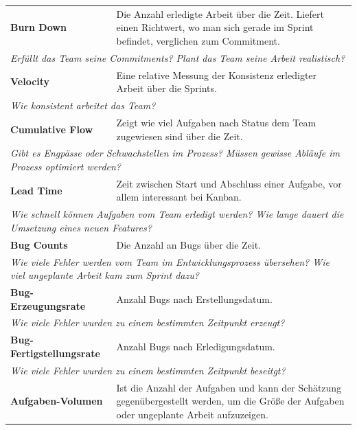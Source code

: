 \begin{table}[H]
  \centering
  \begin{tabular}{p{5cm}p{9.5cm}} \toprule
  \textbf{Burn Down} & Die Anzahl erledigte Arbeit über die Zeit. Liefert einen Richtwert, wo man sich gerade im Sprint befindet, verglichen zum Commitment. \\
  \multicolumn{2}{p{14.5cm}}{\textit{Erfüllt das Team seine Commitments? \newline Plant das Team seine Arbeit realistisch?}} \\ \midrule
  \textbf{Velocity} & Eine relative Messung der Konsistenz erledigter Arbeit über die Sprints. \\
  \multicolumn{2}{p{14.5cm}}{\textit{Wie konsistent arbeitet das Team?}} \\ \midrule
  \textbf{Cumulative Flow} & Zeigt wie viel Aufgaben nach Status dem Team zugewiesen sind über die Zeit. \\
  \multicolumn{2}{p{14.5cm}}{\textit{Gibt es Engpässe oder Schwachstellen im Prozess? \newline Müssen gewisse Abläufe im Prozess optimiert werden?}} \\ \midrule
  \textbf{Lead Time} & Zeit zwischen Start und Abschluss einer Aufgabe, vor allem interessant bei Kanban. \\
  \multicolumn{2}{p{14.5cm}}{\textit{Wie schnell können Aufgaben vom Team erledigt werden? \newline Wie lange dauert die Umsetzung eines neuen Features?}} \\ \midrule
  \textbf{Bug Counts} & Die Anzahl an Bugs über die Zeit. \\
  \multicolumn{2}{p{14.5cm}}{\textit{Wie viele Fehler werden vom Team im Entwicklungsprozess übersehen? \newline Wie viel ungeplante Arbeit kam zum Sprint dazu?}} \\ \midrule
  \textbf{Bug-Erzeugungsrate} & Anzahl Bugs nach Erstellungsdatum. \\
  \multicolumn{2}{p{14.5cm}}{\textit{Wie viele Fehler wurden zu einem bestimmten Zeitpunkt erzeugt?}} \\ \midrule
  \textbf{Bug-Fertigstellungsrate} & Anzahl Bugs nach Erledigungsdatum. \\
  \multicolumn{2}{p{14.5cm}}{\textit{Wie viele Fehler wurden zu einem bestimmten Zeitpunkt beseitgt?}} \\ \midrule
  \textbf{Aufgaben-Volumen} & Ist die Anzahl der Aufgaben und kann der Schätzung gegenübergestellt werden, um die Größe der Aufgaben oder ungeplante Arbeit aufzuzeigen. \\

\end{tabular}
\end{table}
